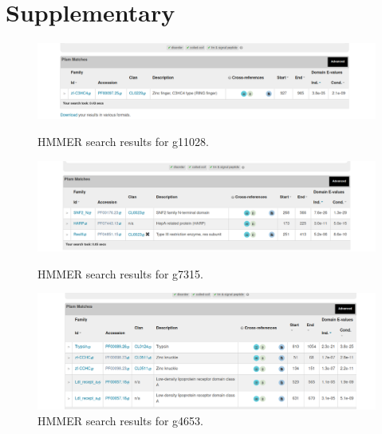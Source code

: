 \documentclass{article}
\begin{document}
 
 \newpage 
 \section{Supplementary}
  \begin{figure}[h]
 	\centering
 	\includegraphics[scale=0.51]{1} 
 	\caption{ HMMER search results for g11028. } 
 	\includegraphics[scale=0.51]{2}
 	\caption{  HMMER search results for g7315. }
 	\includegraphics[scale=0.51]{3}
 	\caption{  HMMER search results for g4653. }
 	\label{screens}
 \end{figure}
 
 
 
\end{document}
